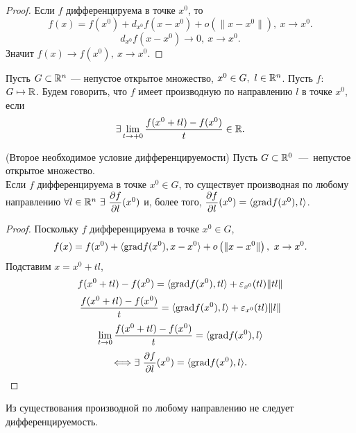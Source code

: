 \begin{proof}
    Если $f$ дифференцируема в точке $x^0$, то 
    $$f(x) = f(x^0) + d_{x^0}f(x-x^0) + o\left(\|x - x^0\|\right), \ x \to x^{0}.$$
    $$d_{x^0}f(x-x^0) \to 0, \ x \to x^{0}.$$
    Значит $f(x) \to f(x^0), \ x \to x^{0}.$
\end{proof}

\begin{definition}
        Пусть $G \subset \mathbb{R}^n$ — непустое открытое множество, $x^0 \in G, \ l \in \mathbb{R}^n$. Пусть $f$: $G \mapsto \mathbb{R}$. Будем говорить, что $f$ имеет производную по направлению $l$ в точке $x^0$, если $$\exists \lim_{t \to +0} \dfrac{f (x^0 + tl) - f(x^0)}{t} \in \mathbb{R} .$$
\end{definition}

\begin{theorem}
    (Второе необходимое условие дифференцируемости) Пусть $G \subset \mathbb{R}^0 $~---~непустое открытое множество. \\
    Если $f$ дифференцируема в точке $x^0 \in G$, то существует производная по любому направлению $\forall l \in \mathbb{R}^n \ \exists \ \dfrac{\partial f}{\partial l} (x^0)$ и, более того, $\dfrac{\partial f}{\partial l} (x^0) = \langle \textup{grad} f(x^0), l \rangle$.
\end{theorem}

\begin{proof}
    Поскольку $f$ дифференцируема в точке $x^0 \in G$,
    $$f(x) = f(x^0) + \langle \textup{grad} f(x^0), x - x^0 \rangle + o\left(\|x - x^0\|\right), \ x \to x^{0}.$$
    Подставим $x = x^0 + tl$,
    $$ f(x^0 + tl) - f(x^0) = \langle \textup{grad} f(x^0), tl \rangle + \varepsilon_{x^0}(tl) \|tl\|$$
    $$\dfrac{f (x^0 + tl) - f(x^0)}{t} = \langle \textup{grad} f(x^0), l \rangle + \varepsilon_{x^0}(tl) \|l\| $$
    $$\lim\limits_{t \to 0} \dfrac{f (x^0 + tl) - f(x^0)}{t} = \langle \textup{grad} f(x^0), l \rangle$$
    $$\Longleftrightarrow \exists \ \dfrac{\partial f}{\partial l} (x^0) = \langle \textup{grad} f(x^0), l \rangle .$$
\end{proof}

\begin{note}
    Из существования производной по любому направлению не следует дифференцируемость.
\end{note}

